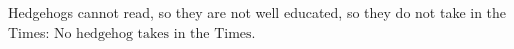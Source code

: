 Hedgehogs cannot read, so they are not well educated, so they do not take in the Times: $\boxed{\text{No hedgehog takes in the Times.}}$
